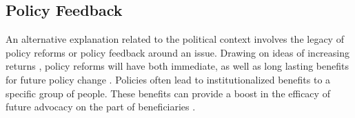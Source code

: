 

\subsection{Policy Feedback}


An alternative explanation related to the political context involves the legacy of policy reforms or policy feedback around an issue. Drawing on ideas of increasing returns \citep{pierson_1996,pierson_2000}, policy reforms will have both immediate, as well as long lasting benefits for future policy change \citep{amenta_et_al_2012}. Policies often lead to institutionalized benefits to a specific group of people. These benefits can provide a boost in the efficacy of future advocacy on the part of beneficiaries \citep{amenta_and_caren_2004}. 




